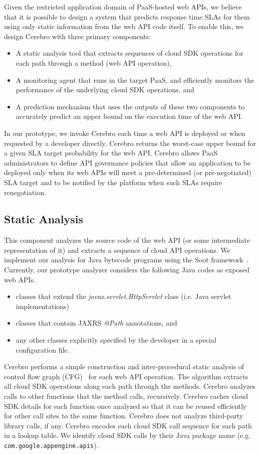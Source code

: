 Given the restricted application domain of PaaS-hosted web APIs, 
we believe that it is possible
to design a system that predicts response time SLAs for them using only
static information from the web API code itself.  To enable this, we design Cerebro
with three primary components:
\begin{itemize}
\item A static analysis tool that extracts sequences of cloud SDK operations for 
each path through a method (web API operation),
\item A monitoring agent that runs in the target PaaS, and efficiently monitors 
the performance of the underlying cloud SDK operations, and
\item A prediction mechanism that uses the outputs of these two components to accurately predict an upper bound on the execution time of the web API.
\end{itemize}
In our prototype, we invoke Cerebro each time a web API is deployed or when requested
by a developer directly. Cerebro returns the worst-case upper bound for a 
given SLA target probability for the web API.  
Cerebro allows PaaS administrators to define API governance policies that 
allow an application to be deployed only when its web APIs will meet a 
pre-determined (or pre-negotiated) SLA target and to be notified 
by the platform when such SLAs require renegotiation.

\subsection{Static Analysis}
 This component analyzes the source code of the web API
(or some intermediate representation of it) and extracts a sequence of cloud API operations.
We implement our analysis for Java bytecode programs
using the Soot framework~\cite{Vallee-Rai:2010:SJB:1925805.1925818}.
Currently, our prototype analyzer considers the 
following Java codes as exposed web APIs.
\begin{itemize}
\item classes that extend the \textit{javax.servlet.HttpServlet} class (i.e. Java servlet implementations)
\item classes that contain JAXRS \textit{@Path} annotations, and
\item any other classes explicitly specified by the developer in a special configuration file.
\end{itemize}

Cerebro performs a simple construction and inter-procedural static analysis 
of control flow graph 
(CFG)~\cite{Allen:1970:CFA:800028.808479,Aho:1986:CPT:6448,Morgan:1998:BOC:288765,Muchnick:1998:ACD:286076} for each web API operation.
The algorithm extracts all cloud SDK operations along
each path through the methods. Cerebro analyzes calls to other functions
that the method calls, recursively.  Cerebro caches cloud SDK details for each function 
once analyzed so that it can be reused efficiently for other call sites to the same
function. Cerebro does not analyze third-party library calls, if any. Cerebro encodes
each cloud SDK call sequence for each path in a lookup table. We identify
cloud SDK calls by their Java package name (e.g. \texttt{com.google.appengine.apis}).

